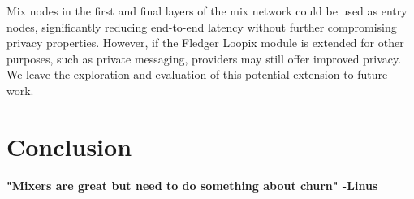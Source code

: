 \documentclass[a4paper,11pt,oneside]{report}
\begin{document}
Mix nodes in the first and final layers of the mix network could be used as entry nodes, significantly reducing end-to-end latency without further compromising privacy properties. However, if the Fledger Loopix module is extended for other purposes, such as private messaging, providers may still offer improved privacy. We leave the exploration and evaluation of this potential extension to future work.

\chapter{Conclusion}

\textbf{"Mixers are great but need to do something about churn" -Linus}


\cleardoublepage
{}
{}
\printbibliography

%
%
\end{document}
